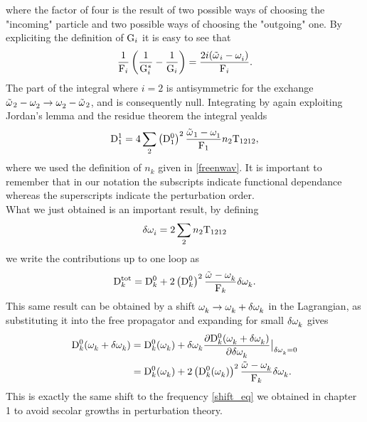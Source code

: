 where the factor of four is the result of two possible ways of choosing the "incoming" particle and two possible ways of choosing the "outgoing" one.
By expliciting the definition of $\mathrm{G}_i$ it is easy to see that
\begin{equation}
    \frac{1}{\mathrm{F}_i}\left( \frac{1}{\mathrm{G}_i^*} - \frac{1}{\mathrm{G}_i}\right) = \frac{2 i(\tilde{\omega^{}}_i - \omega^{}_i)}{\mathrm{F}_i}.
\end{equation}
The part of the integral where $i=2$ is antisymmetric for the exchange $\tilde{\omega^{}}_2 - \omega^{}_2 \rightarrow \omega^{}_2 - \tilde{\omega^{}}_2$, and is consequently null. Integrating
by again exploiting Jordan's lemma and the residue theorem the integral yealds
\begin{equation}
    \mathrm{D}_1^1 = 4\sum_2 \left( \mathrm{D}_1^0 \right)^2\frac{\tilde{\omega^{}}_1 - \omega^{}_1}{\mathrm{F}_1}n_2\mathrm{T}_{1212},
\end{equation}
where we used the definition of $n_k$ given in \eqref{freenwav}. It is important to remember that in our notation the subscripts indicate functional dependance whereas 
the superscripts indicate the perturbation order. \\
What we just obtained is an important result, by defining 
\begin{equation}
    \delta \omega^{}_i = 2\sum_2 n_2 \mathrm{T}_{1212}
\end{equation} 
we write the contributions up to one loop as
\begin{equation}
    \mathrm{D}_k^{\text{tot}} = \mathrm{D}_k^0 + 2\left( \mathrm{D}_k^0 \right)^2 \frac{\tilde{\omega^{}} - \omega^{}_k}{\mathrm{F}_k}\delta \omega^{}_k. 
\end{equation}
This same result can be obtained by a shift $\omega^{}_k \rightarrow \omega^{}_k + \delta \omega^{}_k$ in the Lagrangian, 
as substituting it into the free propagator and expanding for small $\delta \omega^{}_k$ gives
\begin{align}
    \mathrm{D}_k^0(\omega^{}_k + \delta\omega^{}_k) &= \mathrm{D}_k^0(\omega^{}_k) + \delta\omega^{}_k\frac{\partial\mathrm{D}_k^0(\omega^{}_k + \delta\omega^{}_k)}{\partial \delta\omega^{}_k}\big\rvert_{\delta\omega^{}_k = 0} \\ 
    &=   \mathrm{D}_k^0(\omega^{}_k) + 2\left( \mathrm{D}_k^0(\omega^{}_k) \right)^2 \frac{\tilde{\omega^{}} - \omega^{}_k}{\mathrm{F}_k}\delta \omega^{}_k.
\end{align} 
This is exactly the same shift to the frequency \eqref{shift_eq} we obtained in chapter 1 to avoid secolar growths in perturbation theory.
